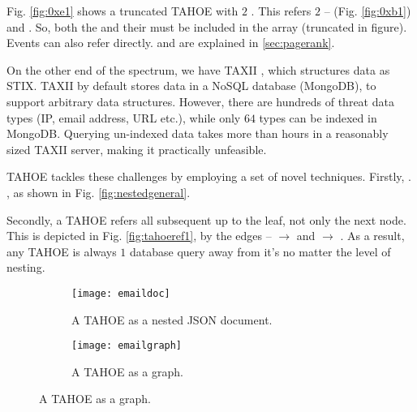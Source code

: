 Fig. \ref{fig:0xe1} shows a truncated TAHOE  with $2$ . This  refers $2$  --  (Fig. \ref{fig:0xb1}) and . So, both the  and their  must be included in the array (truncated in figure). Events can also refer  directly.  and  are explained in \ref{sec:pagerank}.








\fi















\iffalse

On the other end of the spectrum, we have TAXII \cite{connolly2014trusted}, which structures data as STIX. TAXII by default stores data in a NoSQL database (MongoDB), to support arbitrary data structures. However, there are hundreds of threat data types (IP, email address, URL etc.), while only $64$ types can be indexed in MongoDB. Querying un-indexed data takes more than hours in a reasonably sized TAXII server, making it practically unfeasible.

TAHOE  tackles these challenges by employing a set of novel techniques. Firstly, . , as shown in Fig. \ref{fig:nestedgeneral}.

 Secondly, a TAHOE  refers all subsequent  up to the leaf, not only the next node. This is depicted in Fig. \ref{fig:tahoeref1}, by the edges --  $\rightarrow$  and  $\rightarrow$ . As a result, any TAHOE  is always $1$ database query away from it's  no matter the level of nesting.


\begin{figure}[!ht]
    \begin{subfigure}{0.48\textwidth}
	\texttt{[image: emaildoc]} %
	\centering
	\caption{A TAHOE  as a nested JSON document.}
	\label{fig:emaildoc}
    \end{subfigure}
    \begin{subfigure}{0.48\textwidth}
    	\texttt{[image: emailgraph]} %
    	\centering
    	\caption{A TAHOE  as a graph.}
    	\label{fig:emailgraph}
    \end{subfigure}
\end{figure}

